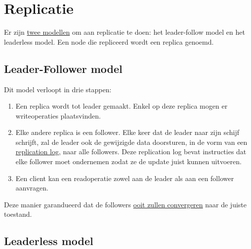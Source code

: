 \documentclass{report}
\begin{document}
	\section{Replicatie}
	\label{sec:replicatie}
	Er zijn \underline{twee modellen} om aan replicatie te doen: het leader-follow model en het leaderless model. Een node die repliceerd wordt een replica genoemd.
	\subsection{Leader-Follower model}
	Dit model verloopt in drie stappen:
	\begin{enumerate}
		\item Een replica wordt tot leader gemaakt. Enkel op deze replica mogen er writeoperaties plaatsvinden.
		\item Elke andere replica is een follower. Elke keer dat de leader naar zijn schijf schrijft, zal de leader ook de gewijzigde data doorsturen, in de vorm van een \underline{replication log}, naar alle followers. Deze replication log bevat instructies dat elke follower moet ondernemen zodat ze de update juist kunnen uitvoeren.
		\item Een client kan een readoperatie zowel aan de leader als aan een follower aanvragen. 
	\end{enumerate}
	Deze manier garandueerd dat de followers \underline{ooit zullen convergeren} naar de juiste toestand.
	\subsection{Leaderless model}
\end{document}
